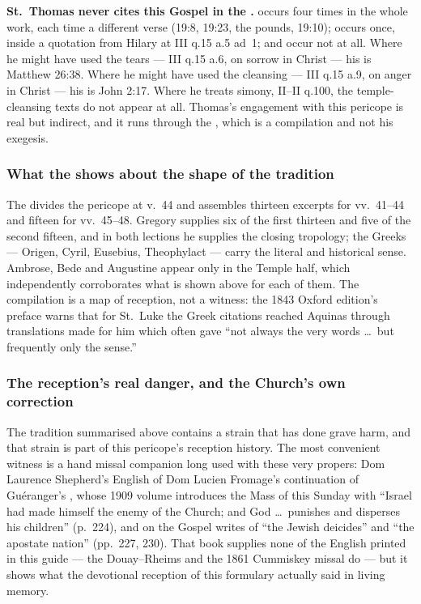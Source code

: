 \textbf{St.\ Thomas never cites this Gospel in the .}
 occurs four times in the whole work, each time a different
verse (19:8, 19:23, the pounds, 19:10);  occurs once, inside a
quotation from Hilary at III q.15 a.5 ad~1;  and
 occur not at all. Where he might have used the tears
--- III q.15 a.6, on sorrow in Christ --- his  is Matthew
26:38. Where he might have used the cleansing --- III q.15 a.9, on anger in
Christ --- his  is John 2:17. Where he treats simony,
II--II q.100, the temple-cleansing texts do not appear at all. Thomas's
engagement with this pericope is real but indirect, and it runs through the
, which is a compilation and not his exegesis.

\subsubsection*{What the  shows about the shape of the tradition}

The  divides the pericope at v.~44 and assembles thirteen
excerpts for vv.~41--44 and fifteen for vv.~45--48. Gregory supplies six of
the first thirteen and five of the second fifteen, and in both lections he
supplies the closing tropology; the Greeks --- Origen, Cyril, Eusebius,
Theophylact --- carry the literal and historical sense. Ambrose, Bede and
Augustine appear only in the Temple half, which independently corroborates
what is shown above for each of them. The compilation is a map of reception, not a
witness: the 1843 Oxford edition's preface warns that for St.~Luke the Greek
citations reached Aquinas through translations made for him which often gave
``not always the very words \dots\ but frequently only the sense.''

\subsubsection*{The reception's real danger, and the Church's own correction}

The tradition summarised above contains a strain that has done grave harm,
and that strain is part of this pericope's reception history. The most
convenient witness is a hand missal companion long used with these very
propers: Dom Laurence Shepherd's English of Dom Lucien Fromage's continuation
of Guéranger's , whose 1909 volume introduces the Mass of this Sunday with ``Israel had
made himself the enemy of the Church; and God \dots\ punishes and disperses
his children'' (p.~224), and on the Gospel writes of ``the Jewish deicides''
and ``the apostate nation'' (pp.~227, 230). That book supplies none of the
English printed in this guide --- the Douay--Rheims and the 1861 Cummiskey
missal do --- but it shows what the devotional reception of this formulary
actually said in living memory.

